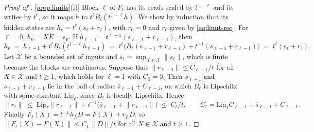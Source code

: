 \documentclass[10pt]{article}
\theoremstyle{definition}
\theoremstyle{remark}
\newcommand{\norm}[1]{\lVert #1\rVert}
\DeclareRobustCommand{\cpref}[2]{\hyperref[#1:#2]{\cref*{#1}(#2)}}
\begin{document}
\begin{proof}[Proof of \cpref{prop:limits}{i}]
Block $\ell$ of $F_t$ has its reads scaled by $t^{1-\ell}$ and its writes by $t^\ell$, so it maps $h$ to $t^\ell B_\ell(t^{1-\ell}h)$. We show by induction that its hidden states are $h_\ell = t^\ell(s_\ell + r_\ell)$, with $r_0 = 0$ and $r_\ell$ given by \cref{eq:limit-rec}. For $\ell = 0$, $h_0 = XE = s_0$. If $h_{\ell-1} = t^{\ell-1}(s_{\ell-1} + r_{\ell-1})$, then
\[
h_\ell \;=\; h_{\ell-1} + t^\ell B_\ell(t^{1-\ell}h_{\ell-1}) \;=\; t^\ell\big(B_\ell(s_{\ell-1} + r_{\ell-1}) + t^{-1}(s_{\ell-1} + r_{\ell-1})\big) \;=\; t^\ell(s_\ell + r_\ell).
\]
Let $\mathcal X$ be a bounded set of inputs and $\bar s_\ell = \sup_{X \in \mathcal X}\norm{s_\ell}$, which is finite because the blocks are continuous. Suppose that $\norm{r_{\ell-1}} \le C_{\ell-1}/t$ for all $X \in \mathcal X$ and $t \ge 1$, which holds for $\ell = 1$ with $C_0 = 0$. Then $s_{\ell-1}$ and $s_{\ell-1} + r_{\ell-1}$ lie in the ball of radius $\bar s_{\ell-1} + C_{\ell-1}$, on which $B_\ell$ is Lipschitz with some constant $\mathrm{Lip}_\ell$, since $B_\ell$ is locally Lipschitz. Hence
\[
\norm{r_\ell} \;\le\; \mathrm{Lip}_\ell\norm{r_{\ell-1}} + t^{-1}\big(\bar s_{\ell-1} + \norm{r_{\ell-1}}\big) \;\le\; C_\ell/t, \qquad C_\ell = \mathrm{Lip}_\ell C_{\ell-1} + \bar s_{\ell-1} + C_{\ell-1}.
\]
Finally $F_t(X) = t^{-L}h_LD = F(X) + r_LD$, so $\norm{F_t(X) - F(X)} \le C_L\norm{D}/t$ for all $X \in \mathcal X$ and $t \ge 1$.
\end{proof}
\end{document}
